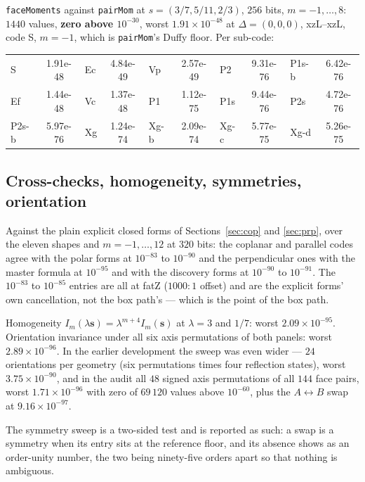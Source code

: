 \documentclass[11pt]{article}
\theoremstyle{remark}
\newcommand{\code}[1]{\texttt{#1}}
\begin{document}
\code{faceMoments} against \code{pairMom} at $s = (3/7, 5/11, 2/3)$, $256$ bits,
$m = -1,\ldots,8$: $1440$ values, \textbf{zero above $10^{-30}$}, worst
$1.91\times10^{-48}$ at $\Delta = (0,0,0)$, xzL--xzL, code S, $m = -1$, which is
\code{pairMom}'s Duffy floor. Per sub-code:

\begin{center}\small
\begin{tabular}{@{}lclclclclc@{}}
\toprule
S & 1.91e-48 & Ec & 4.84e-49 & Vp & 2.57e-49 & P2 & 9.31e-76 & P1s-b & 6.42e-76\\
Ef & 1.44e-48 & Vc & 1.37e-48 & P1 & 1.12e-75 & P1s & 9.44e-76 & P2s & 4.72e-76\\
P2s-b & 5.97e-76 & Xg & 1.24e-74 & Xg-b & 2.09e-74 & Xg-c & 5.77e-75 & Xg-d & 5.26e-75\\
\bottomrule
\end{tabular}
\end{center}

\subsection{Cross-checks, homogeneity, symmetries, orientation}

Against the plain explicit closed forms of Sections~\ref{sec:cop} and \ref{sec:prp}, over
the eleven shapes and $m = -1,\ldots,12$ at $320$ bits: the coplanar and parallel codes
agree with the polar forms at $10^{-83}$ to $10^{-90}$ and the perpendicular ones with the
master formula at $10^{-95}$ and with the discovery forms at $10^{-90}$ to $10^{-91}$. The
$10^{-83}$ to $10^{-85}$ entries are all at fatZ ($1000{:}1$ offset) and are the explicit
forms' own cancellation, not the box path's --- which is the point of the box path.

Homogeneity $I_m(\lambda\mathbf{s}) = \lambda^{m+4}I_m(\mathbf{s})$ at $\lambda = 3$ and
$1/7$: worst $2.09\times10^{-95}$. Orientation invariance under all six axis permutations
of both panels: worst $2.89\times10^{-96}$. In the earlier development the sweep was even
wider --- $24$ orientations per geometry (six permutations times four reflection states),
worst $3.75\times10^{-90}$, and in the audit all $48$ signed axis permutations of all
$144$ face pairs, worst $1.71\times10^{-96}$ with zero of $69\,120$ values above
$10^{-60}$, plus the $A\leftrightarrow B$ swap at $9.16\times10^{-97}$.

The symmetry sweep is a two-sided test and is reported as such: a swap is a symmetry when
its entry sits at the reference floor, and its absence shows as an order-unity number, the
two being ninety-five orders apart so that nothing is ambiguous.
\end{document}
